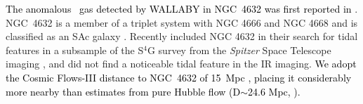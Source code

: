\documentclass[fleqn,usenatbib]{mnras}
\newcommand{\kms}{\textrm{km s}^{-1}}
\newcommand{\hi}{\text{H\,\sc{i}}}
\begin{document}
  \textcolor{black}{The anomalous \hi\ gas detected by WALLABY in NGC~4632 was first reported in \citet{Lee2022}}.  
 NGC~4632 is a member of a triplet system with NGC 4666 and NGC 4668 \citep{Sandage1994} and is classified as an SAc galaxy \citep{Ann2015}.  Recently \citet{Morales2018} included NGC 4632 in their search for tidal features in a subsample of the S$^{4}$G survey \citep{Sheth2010,Querejeta2015} from the \textit{Spitzer} Space Telescope imaging \citep{Werner2004}, and did not find a noticeable tidal feature in the IR imaging.  \textcolor{black}{We adopt the Cosmic Flows-III distance to NGC~4632 of 15~Mpc \citep{Tully2016}, placing it considerably more nearby than estimates from pure Hubble flow (D$\sim$24.6 Mpc, \citealt{SoFiARelease}).}  %
\end{document}
